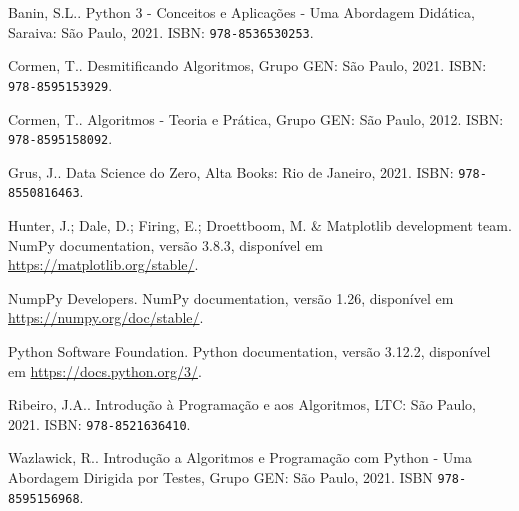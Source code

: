 \begin{thebibliography}{99}
    Banin, S.L.. Python 3 - Conceitos e Aplicações - Uma Abordagem Didática, Saraiva: São Paulo, 2021. ISBN: \texttt{978-8536530253}.
  
    Cormen, T.. Desmitificando Algoritmos, Grupo GEN: São Paulo, 2021. ISBN: \texttt{978-8595153929}.
  
    Cormen, T.. Algoritmos - Teoria e Prática, Grupo GEN: São Paulo, 2012. ISBN: \texttt{978-8595158092}.
  
    Grus, J.. Data Science do Zero, Alta Books: Rio de Janeiro, 2021. ISBN: \texttt{978-8550816463}.
  
    Hunter, J.; Dale, D.; Firing, E.; Droettboom, M. \& Matplotlib development team. NumPy documentation, versão 3.8.3, disponível em \url{https://matplotlib.org/stable/}.
  
    NumpPy Developers. NumPy documentation, versão 1.26, disponível em \url{https://numpy.org/doc/stable/}.
  
    Python Software Foundation. Python documentation, versão 3.12.2, disponível em \url{https://docs.python.org/3/}.
  
    Ribeiro, J.A.. Introdução à Programação e aos Algoritmos, LTC: São Paulo, 2021. ISBN: \texttt{978-8521636410}.
  
    Wazlawick, R.. Introdução a Algoritmos e Programação com Python - Uma Abordagem Dirigida por Testes, Grupo GEN: São Paulo, 2021. ISBN \texttt{978-8595156968}.
  
  \end{thebibliography}
  